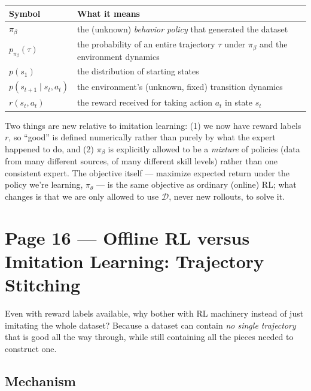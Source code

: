 \documentclass[11pt]{article}
\begin{document}
\begin{center}
\begin{tabular}{@{}ll@{}}
\toprule
Symbol & What it means \\
\midrule
$\pi_\beta$ & the (unknown) \emph{behavior policy} that generated the dataset \\
$p_{\pi_\beta}(\tau)$ & the probability of an entire trajectory $\tau$ under $\pi_\beta$ and the environment dynamics \\
$p(s_1)$ & the distribution of starting states \\
$p(s_{t+1}\mid s_t,a_t)$ & the environment's (unknown, fixed) transition dynamics \\
$r(s_t,a_t)$ & the reward received for taking action $a_t$ in state $s_t$ \\
\bottomrule
\end{tabular}
\end{center}

Two things are new relative to imitation learning: (1) we now have reward labels $r$, so ``good'' is defined numerically rather than purely by what the expert happened to do, and (2) $\pi_\beta$ is explicitly allowed to be a \emph{mixture} of policies (data from many different sources, of many different skill levels) rather than one consistent expert. The objective itself --- maximize expected return under the policy we're learning, $\pi_\theta$ --- is the same objective as ordinary (online) RL; what changes is that we are only allowed to use $\mathcal{D}$, never new rollouts, to solve it.

\section*{Page 16 --- Offline RL versus Imitation Learning: Trajectory Stitching}

Even with reward labels available, why bother with RL machinery instead of just imitating the whole dataset? Because a dataset can contain \emph{no single trajectory} that is good all the way through, while still containing all the pieces needed to construct one.

\subsection*{Mechanism}
\end{document}
